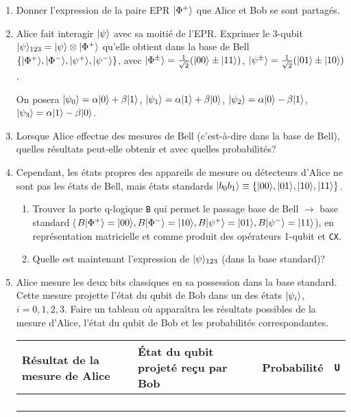 \begin{enumerate}
 \item Donner l'expression de la paire EPR $\vert\Phi^{+}\rangle$ que Alice et Bob se
sont partagés.

\item Alice fait interagir $\vert\psi\rangle$ avec sa moitié de l'EPR. Exprimer le
3-qubit $\vert\psi\rangle_{123}=\vert\psi\rangle\otimes\vert\Phi^{+}\rangle$ qu'elle obtient dans
la base de Bell
$\{\vert\Phi^{+}\rangle,\vert\Phi^{-}\rangle,\vert\psi^{+}\rangle,\vert\psi^{-}\rangle\}$, avec
$\vert\Phi^{\pm}\rangle=\frac{1}{\sqrt{2}}(\vert00\rangle\pm\vert11\rangle)$,
$\vert\psi^{\pm}\rangle=\frac{1}{\sqrt{2}}(\vert01\rangle\pm\vert10\rangle)$.

On posera
$\vert\psi_0\rangle=\alpha\vert0\rangle+\beta\vert1\rangle$,
$\vert\psi_1\rangle=\alpha\vert1\rangle+\beta\vert0\rangle$,
$\vert\psi_{2}\rangle=\alpha\vert0\rangle-\beta\vert1\rangle$,
$\vert\psi_{3}\rangle=\alpha\vert1\rangle-\beta\vert0\rangle$.

\item Lorsque Alice effectue des mesures de Bell (c'est-à-dire dans la
base de Bell), quelles résultats peut-elle obtenir et avec quelles probabilités?

\item Cependant, les états propres des appareils de mesure ou détecteurs d'Alice
ne sont pas les états de Bell, mais états standards $\vert b_0b_1\rangle\equiv
\{\vert00\rangle,\vert01\rangle,\vert10\rangle,\vert11\rangle\}$.
\begin{enumerate}
\item Trouver la porte q-logique \texttt{B} qui permet le passage base de Bell
$\rightarrow$ base standard ($B\vert\Phi^{+}\rangle=\vert00\rangle,B\vert\Phi^{-}\rangle
=\vert10\rangle,B\vert\psi^{+}\rangle=\vert01\rangle,B\vert\psi^{-}\rangle=\vert11\rangle$), en représentation
matricielle et comme produit des opérateurs 1-qubit et \texttt{CX}.

\item Quelle est maintenant l'expression de $\vert\psi\rangle_{123}$ (dans la base
standard)?
\end{enumerate}

\item Alice mesure les deux bits classiques en sa possession dans la base
standard. Cette mesure projette l'état du qubit de Bob dans un des états
$\vert\psi_{i}\rangle$, $i=0,1,2,3$. Faire un tableau où apparaîtra les résultats
possibles de la mesure d'Alice, l'état du qubit de Bob et les probabilités
correspondantes.

\begin{center}
\begin{tabular}
[c]{|p{4cm}|p{4cm}|p{3cm}|p{3cm}|}\hline\hline
\rowcolor[gray]{0.8}Résultat de la mesure de Alice &
État du qubit projeté reçu par Bob & Probabilité & \texttt{U}\\\hline\hline
&  &  & \\\hline
&  &  & \\\hline
&  &  & \\\hline
&  &  & \\\hline
\end{tabular}
\end{center}


\end{enumerate}
